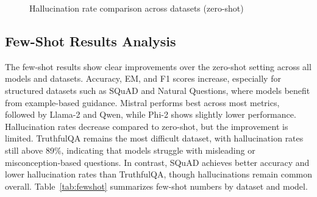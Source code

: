 \documentclass[sigconf,nonacm]{acmart}
\begin{document}
\begin{figure}[H]
\centering
{}
\caption{Hallucination rate comparison across datasets (zero-shot)}
\label{fig:zs-hr}
\end{figure}

\subsection{Few-Shot Results Analysis}
The few-shot results show clear improvements over the zero-shot setting across all models and datasets. Accuracy, EM, and F1 scores increase, especially for structured datasets such as SQuAD and Natural Questions, where models benefit from example-based guidance. Mistral performs best across most metrics, followed by Llama-2 and Qwen, while Phi-2 shows slightly lower performance. Hallucination rates decrease compared to zero-shot, but the improvement is limited. TruthfulQA remains the most difficult dataset, with hallucination rates still above 89\%, indicating that models struggle with misleading or misconception-based questions. In contrast, SQuAD achieves better accuracy and lower hallucination rates than TruthfulQA, though hallucinations remain common overall. Table~\ref{tab:fewshot} summarizes few-shot numbers by dataset and model.
\end{document}
